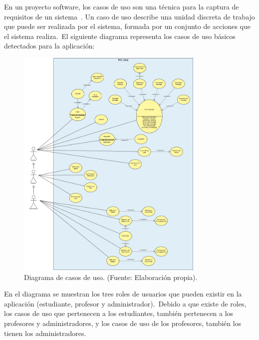 
En un proyecto software, los casos de uso son una técnica para la captura de requisitos de un sistema~\cite{use_cases}.
Un caso de uso describe una unidad discreta de trabajo que puede ser realizada por el sistema, formada por un conjunto
de acciones que el sistema realiza.\ El siguiente diagrama representa los casos de uso básicos detectados para
la aplicación:

\begin{figure}[H]
	\centering
	\includegraphics[width=0.8\textwidth]{res/images/RSChat-Diagrams-Usecases}
	\caption{Diagrama de casos de uso. (Fuente: Elaboración propia).}
	\label{fig:casosDeUso}
\end{figure}

En el diagrama se muestran los tres roles de usuarios que pueden existir en la aplicación (estudiante, profesor y
administrador).\ Debido a que existe  de roles, los casos de uso que pertenecen a los estudiantes,
también pertenecen a los profesores y administradores, y los casos de uso de los profesores, también los
tienen los administradores.

